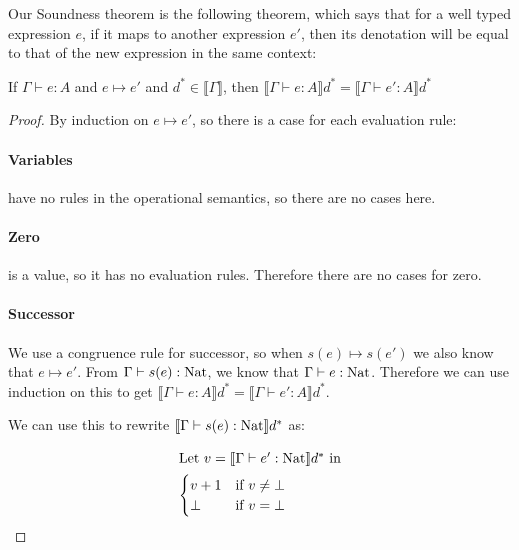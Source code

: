 Our Soundness theorem is the following theorem, which says that for a well typed expression $e$, if it maps to another expression $e'$, then its denotation will be equal to that of the new expression in the same context:

\vspace{0.35cm}

\begin{thm}
If $\Gamma \vdash e: A$ and $e \mapsto e'$ and $d^* \in \llbracket \Gamma \rrbracket$, then $\llbracket \Gamma \vdash e : A \rrbracket d^* =  \llbracket \Gamma \vdash e' : A \rrbracket d^*$
\end{thm}

\begin{proof}
By induction on $e \mapsto e'$, so there is a case for each evaluation rule:

\paragraph{Variables} have no rules in the operational semantics, so there are no cases here.

\paragraph{Zero} is a value, so it has no evaluation rules. Therefore there are no cases for zero.

\paragraph{Successor} We use a congruence rule for successor, so when $s(e) \mapsto s(e')$ we also know that $e \mapsto e'$. From $\Gamma \vdash s(e) : \operatorname{Nat}$, we know that $\Gamma \vdash e : \operatorname{Nat}$. Therefore we can use induction on this to get $\llbracket \Gamma \vdash e : A \rrbracket d^* =  \llbracket \Gamma \vdash e' : A \rrbracket d^*$.

We can use this to rewrite $\llbracket \Gamma \vdash s(e) : \operatorname{Nat} \rrbracket d^*$ as:

\begin{minipage}{4in}
\begin{align*}
\intertext{Let $v = \llbracket \Gamma \vdash e' : \operatorname{Nat} \rrbracket d^*$ in}
  \begin{cases}
            v+1 & \text{if } v \neq \bot  \\
           \bot & \text{if } v = \bot
  \end{cases}
\end{align*} 
\end{minipage}


\end{proof}
